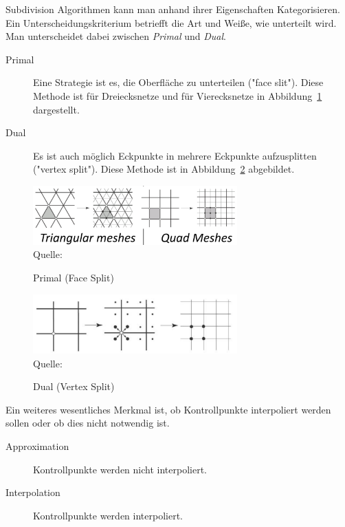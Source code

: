 Subdivision Algorithmen kann man anhand ihrer Eigenschaften Kategorisieren.
Ein Unterscheidungskriterium betriefft die Art und Weiße, wie unterteilt wird.
Man unterscheidet dabei zwischen \emph{Primal} und \emph{Dual}.
\begin{description}
 \item[Primal] Eine Strategie ist es, die Oberfläche zu unterteilen ("face slit").
 Diese Methode ist für Dreiecksnetze und für Vierecksnetze in Abbildung~\ref{fig:sd_primal} dargestellt.
 \item[Dual] Es ist auch möglich Eckpunkte in mehrere Eckpunkte aufzusplitten ("vertex split").
 Diese Methode ist in Abbildung~\ref{fig:sd_dual} abgebildet.
\end{description}
\begin{figure}[h]
  \caption{Primal (Face Split)}
  \centering
  \includegraphics[width=0.7\textwidth]{content/media/sd_primal}
  \\Quelle: \cite{Standford.}
  \label{fig:sd_primal}
\end{figure}
\begin{figure}[h]
  \caption{Dual (Vertex Split)}
  \centering
  \includegraphics[width=0.7\textwidth]{content/media/sd_dual}
  \\Quelle: \cite{Standford.}
  \label{fig:sd_dual}
\end{figure}

Ein weiteres wesentliches Merkmal ist, ob Kontrollpunkte interpoliert werden sollen oder ob dies nicht notwendig ist. 
\begin{description}
 \item[Approximation] Kontrollpunkte werden nicht interpoliert.
 \item[Interpolation] Kontrollpunkte werden interpoliert.
\end{description}

